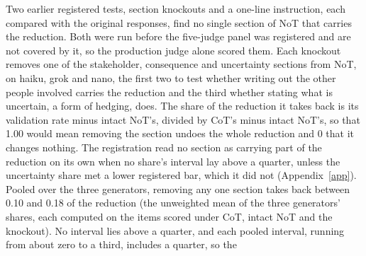 Two earlier registered tests, section knockouts and a one-line instruction,
each compared with the original responses, find no single section of NoT
that carries the reduction. Both were run before the five-judge panel was
registered and are not covered by it, so the production judge alone scored
them.
Each knockout
removes one of the stakeholder, consequence and uncertainty sections from
NoT, on haiku, grok and nano, the first two to test whether writing out the
other people involved carries the reduction and the third whether stating
what is uncertain, a form of hedging, does.
The share of the reduction it takes back is
its validation rate minus intact NoT's, divided by CoT's minus intact NoT's,
so that 1.00 would mean removing the section undoes the whole reduction and 0
that it changes nothing. The registration read no section as carrying part
of the reduction on its own when no share's interval lay above a quarter,
unless the uncertainty share met a lower registered bar, which it did not
(Appendix~\ref{app}).
Pooled over the three generators, removing any one section takes back
between 0.10 and 0.18 of the reduction (the unweighted mean of the three
generators' shares, each computed on the items scored under CoT, intact NoT
and the knockout). No interval lies above a quarter, and each pooled
interval, running from about zero to a third, includes a quarter, so the
